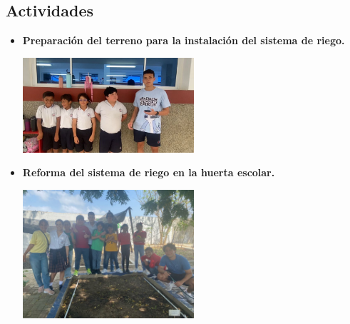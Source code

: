 \documentclass[12pt]{article}
\begin{document}
\subsection{Actividades}
\begin{itemize}
      \item \textbf{Preparación del terreno para la instalación del sistema de riego.}
            \begin{center}
                  \includegraphics[width=0.5\textwidth]{imagenes/actividad1.jpg}
            \end{center}

      \item \textbf{Reforma del sistema de riego en la huerta escolar.}
            \begin{center}
                  \includegraphics[width=0.5\textwidth]{imagenes/actividad2.jpg}
            \end{center}


\end{itemize}
\end{document}
